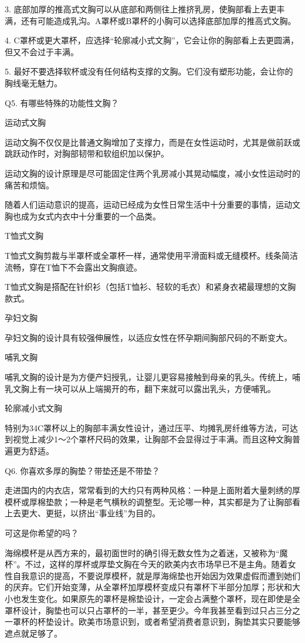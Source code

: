 \documentclass[12pt,UTF8]{ctexbook}
\begin{document}
3. 底部加厚的推高式文胸可以从底部和两侧往上推挤乳房，使胸部看上去更丰满，还有可能造成乳沟。A罩杯或B罩杯的小胸可以选择底部加厚的推高式文胸。

4. C罩杯或更大罩杯，应选择“轮廓减小式文胸”，它会让你的胸部看上去更圆满，但又不会过于丰满。

5. 最好不要选择软杯或没有任何结构支撑的文胸。它们没有塑形功能，会让你的胸线毫无魅力。





Q5. 有哪些特殊的功能性文胸？


运动式文胸

运动文胸不仅仅是比普通文胸增加了支撑力，而是在女性运动时，尤其是做前跃或跳跃动作时，对胸部韧带和软组织加以保护。

运动文胸的设计原理是尽可能固定住两个乳房减小其晃动幅度，减小女性运动时的痛苦和烦恼。

随着人们运动意识的提高，运动已经成为女性日常生活中十分重要的事情，运动文胸也成为女式内衣中十分重要的一个品类。

T恤式文胸

T恤式文胸剪裁与半罩杯或全罩杯一样，通常使用平滑面料或无缝模杯。线条简洁流畅，穿在T恤下不会露出文胸痕迹。

T恤式文胸是搭配在针织衫（包括T恤衫、轻软的毛衣）和紧身衣裙最理想的文胸款式。

孕妇文胸

孕妇文胸的设计具有较强伸展性，以适应女性在怀孕期间胸部尺码的不断变大。

哺乳文胸

哺乳文胸的设计是为方便产妇授乳，让婴儿更容易接触到母亲的乳头。传统上，哺乳文胸上有一块可以从上端揭开的布，翻下来就可以露出乳头，方便哺乳。

轮廓减小式文胸

特别为34C罩杯以上的胸部丰满女性设计，通过压平、均摊乳房纤维等方法，可达到视觉上减少1～2个罩杯尺码的效果，让胸部不会显得过于丰满。而且这种文胸普遍更为舒适。





Q6. 你喜欢多厚的胸垫？带垫还是不带垫？


走进国内的内衣店，常常看到的大约只有两种风格：一种是上面附着大量刺绣的厚模杯或厚棉垫款；一种是老气横秋的调整型。无论哪一种，其实都是为了让胸部看上去更大、更挺，以挤出“事业线”为目的。

可这是你希望的吗？

海绵模杯是从西方来的，最初面世时的确引得无数女性为之着迷，又被称为“魔杯”。不过，这样的厚杯或厚垫文胸在今天的欧美内衣市场早已不是主角。随着女性自我意识的提高，不要说厚模杯，就是厚海绵垫也开始因为效果虚假而遭到她们的厌弃。它们开始变薄，从全罩杯加厚模杯变成只有罩杯下半部分加厚；形状和大小也发生变化。如果原先的罩杯是棉垫设计，一定会占满整个罩杯，现在即使是全罩杯设计，胸垫也可以只占罩杯的一半，甚至更少。今年我甚至看到过只占三分之一罩杯的杯垫设计。欧美市场意识到，或者希望消费者意识到，胸垫其实只要能够遮点就足够了。
\end{document}
